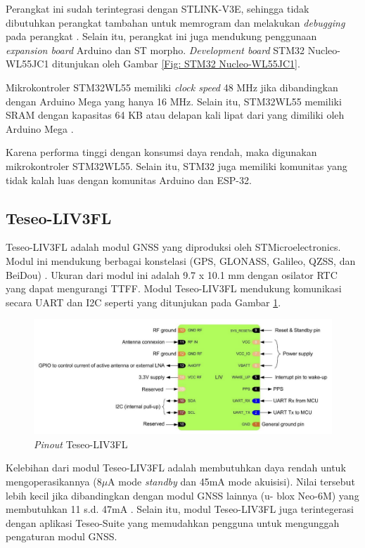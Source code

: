 Perangkat ini sudah terintegrasi dengan STLINK-V3E, sehingga tidak dibutuhkan perangkat tambahan untuk memrogram dan melakukan \textit{debugging} pada perangkat \cite{STMicroelectronics2022}. Selain itu, perangkat ini juga mendukung penggunaan \textit{expansion board} Arduino dan ST morpho. \textit{Development board} STM32 Nucleo-WL55JC1 ditunjukan oleh Gambar \ref{Fig: STM32 Nucleo-WL55JC1}.

Mikrokontroler STM32WL55 memiliki \textit{clock speed} 48 MHz jika dibandingkan dengan Arduino Mega yang hanya 16 MHz. Selain itu, STM32WL55 memiliki SRAM dengan kapasitas 64 KB atau delapan kali lipat dari yang dimiliki oleh Arduino Mega \cite{STMicroelectronics2022b}.

Karena performa tinggi dengan konsumsi daya rendah, maka digunakan mikrokontroler STM32WL55. Selain itu, STM32 juga memiliki komunitas yang tidak kalah luas dengan komunitas Arduino dan ESP-32.

\subsection{Teseo-LIV3FL}
Teseo-LIV3FL adalah modul GNSS yang diproduksi oleh STMicroelectronics. Modul ini mendukung berbagai konstelasi (GPS, GLONASS, Galileo, QZSS, dan BeiDou) \cite{STMicroelectronics2022}. 
Ukuran dari modul ini adalah 9.7 x 10.1 mm dengan osilator RTC yang dapat mengurangi TTFF. Modul Teseo-LIV3FL mendukung komunikasi secara UART dan I2C seperti yang ditunjukan pada Gambar \ref{Fig: teseo_pinout}.
\begin{figure}[ht]
	\centering
	\includegraphics[width=13cm]{contents/chapter-2/teseo_pinout.png}
	\caption{\textit{Pinout} Teseo-LIV3FL \cite{STMicroelectronics2022a}}
	\label{Fig: teseo_pinout}
\end{figure}

Kelebihan dari modul Teseo-LIV3FL adalah membutuhkan daya rendah untuk mengoperasikannya (8$\mu$A mode \textit{standby} dan 45mA mode akuisisi). Nilai tersebut lebih kecil jika dibandingkan dengan modul GNSS lainnya (u- blox Neo-6M) yang membutuhkan 11 s.d. 47mA \cite{U-blox2011}. Selain itu, modul Teseo-LIV3FL juga terintegerasi dengan aplikasi Teseo-Suite yang memudahkan pengguna untuk mengunggah pengaturan modul GNSS.
